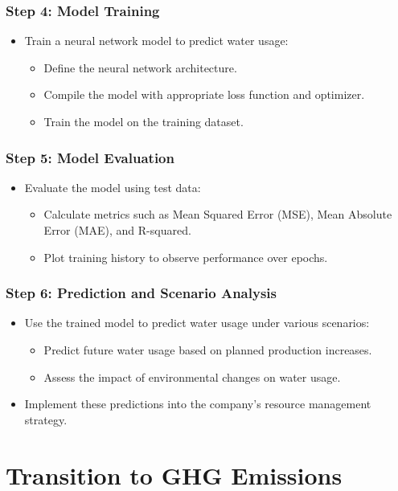 \documentclass{beamer}
\begin{document}
\begin{frame}
\frametitle{Step 4: Model Training}
\begin{itemize}
    \item Train a neural network model to predict water usage:
        \begin{itemize}
            \item Define the neural network architecture.
            \item Compile the model with appropriate loss function and optimizer.
            \item Train the model on the training dataset.
        \end{itemize}
\end{itemize}
\end{frame}

\begin{frame}
\frametitle{Step 5: Model Evaluation}
\begin{itemize}
    \item Evaluate the model using test data:
        \begin{itemize}
            \item Calculate metrics such as Mean Squared Error (MSE), Mean Absolute Error (MAE), and R-squared.
            \item Plot training history to observe performance over epochs.
        \end{itemize}
\end{itemize}
\end{frame}

\begin{frame}
\frametitle{Step 6: Prediction and Scenario Analysis}
\begin{itemize}
    \item Use the trained model to predict water usage under various scenarios:
        \begin{itemize}
            \item Predict future water usage based on planned production increases.
            \item Assess the impact of environmental changes on water usage.
        \end{itemize}
    \item Implement these predictions into the company's resource management strategy.
\end{itemize}
\end{frame}

\section{Transition to GHG Emissions}
\end{document}
